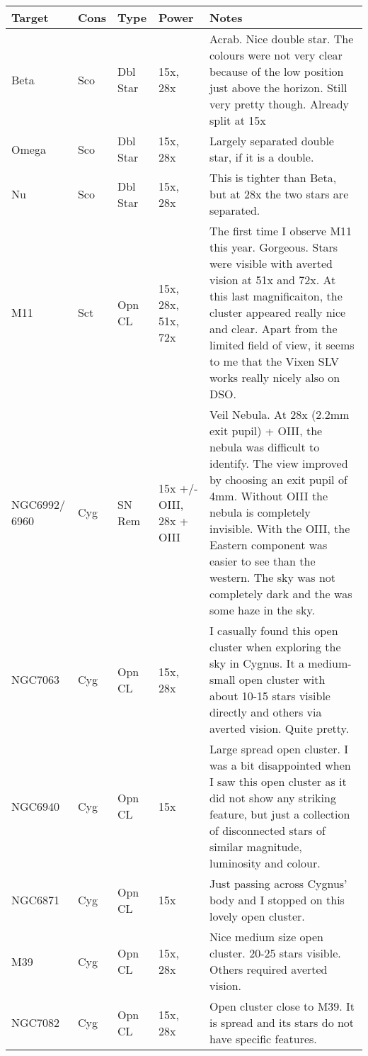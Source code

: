 \begin{longtable}{ p{0.7in}  p{0.3in}  p{0.6in}  p{0.9in}  p{5.8in} }
\hline 
{\bf Target} & {\bf Cons} & {\bf Type} & {\bf Power} & {\bf Notes} \\ 
\hline 
Beta & Sco & Dbl Star & 15x, 28x & Acrab. Nice double star. The colours were not very clear because of the low position just above the horizon. Still very pretty though. Already split at 15x \\ 
Omega & Sco & Dbl Star & 15x, 28x & Largely separated double star, if it is a double. \\ 
Nu & Sco & Dbl Star & 15x, 28x & This is tighter than Beta, but at 28x the two stars are separated. \\ 
M11 & Sct & Opn CL & 15x, 28x, 51x, 72x & The first time I observe M11 this year. Gorgeous. Stars were visible with averted vision at 51x and 72x. At this last magnificaiton, the cluster appeared really nice and clear. Apart from the limited field of view, it seems to me that the Vixen SLV works really nicely also on DSO. \\ 
NGC6992/ 6960 & Cyg & SN Rem & 15x +/- OIII, 28x + OIII & Veil Nebula. At 28x (2.2mm exit pupil) + OIII, the nebula was difficult to identify. The view improved by choosing an exit pupil of 4mm. Without OIII the nebula is completely invisible. With the OIII, the Eastern component was easier to see than the western. The sky was not completely dark and the was some haze in the sky. \\ 
NGC7063 & Cyg & Opn CL & 15x, 28x & I casually found this open cluster when exploring the sky in Cygnus. It a medium-small open cluster with about 10-15 stars visible directly and others via averted vision. Quite pretty. \\ 
NGC6940 & Cyg & Opn CL & 15x & Large spread open cluster. I was a bit disappointed when I saw this open cluster as it did not show any striking feature, but just a collection of disconnected stars of similar magnitude, luminosity and colour.  \\ 
NGC6871 & Cyg & Opn CL & 15x & Just passing across Cygnus' body and I stopped on this lovely open cluster.  \\ 
M39 & Cyg & Opn CL & 15x, 28x & Nice medium size open cluster. 20-25 stars visible. Others required averted vision. \\ 
NGC7082 & Cyg & Opn CL & 15x, 28x & Open cluster close to M39. It is spread and its stars do not have specific features. \\ 
\hline 
\end{longtable} 
